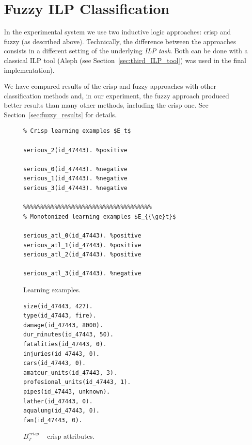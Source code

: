 \clearpage










\section{Fuzzy ILP Classification}

In the experimental system we use two inductive logic approaches: crisp and fuzzy (as described above). Technically, the difference between the approaches consists in a different setting of the underlying \emph{ILP task}. Both can be done with a classical ILP tool (Aleph (see Section~\ref{sec:third_ILP_tool}) was used in the final implementation).

We have compared results of the crisp and fuzzy approaches with other classification methods and, in our experiment, the fuzzy approach produced better results than many other methods, including the crisp one. See Section~\ref{sec:fuzzy_results} for details.



\begin{figure}
\begin{minipage}[b]{0.5\hsize}
\begin{verbatim}
% Crisp learning examples $E_t$

serious_2(id_47443). %positive

serious_0(id_47443). %negative
serious_1(id_47443). %negative
serious_3(id_47443). %negative							

%%%%%%%%%%%%%%%%%%%%%%%%%%%%%%%%%%%%%
% Monotonized learning examples $E_{{\ge}t}$

serious_atl_0(id_47443). %positive
serious_atl_1(id_47443). %positive
serious_atl_2(id_47443). %positive

serious_atl_3(id_47443). %negative					
\end{verbatim}						
	\caption{Learning examples.}
	\label{fig:examples}
\end{minipage}
\hspace{0.5cm}
\begin{minipage}[b]{0.5\hsize}
\begin{verbatim}
size(id_47443, 427).
type(id_47443, fire).
damage(id_47443, 8000).
dur_minutes(id_47443, 50).
fatalities(id_47443, 0).
injuries(id_47443, 0).
cars(id_47443, 0).
amateur_units(id_47443, 3).
profesional_units(id_47443, 1).
pipes(id_47443, unknown).
lather(id_47443, 0).
aqualung(id_47443, 0).
fan(id_47443, 0).
\end{verbatim}						
	\caption{$B^{crisp}_{T}$ -- crisp attributes.}
	\label{fig:crisp_attributes}
\end{minipage}
\end{figure}






